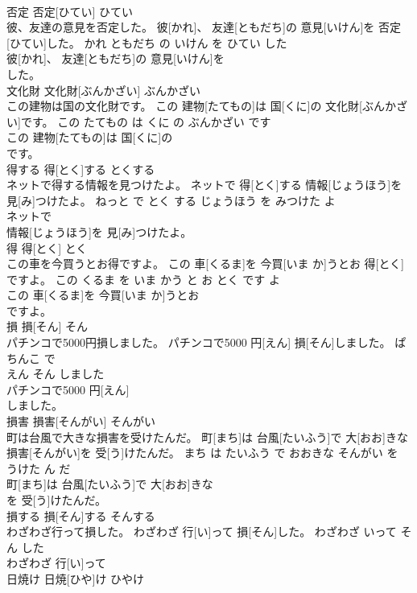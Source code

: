 \documentclass[8pt]{extreport}
\begin{document}
\begin{CJK}{UTF8}{min}
\\	否定	否定[ひてい]	ひてい	
\\	彼、友達の意見を否定した。	彼[かれ]、 友達[ともだち]の 意見[いけん]を 否定[ひてい]した。	かれ ともだち の いけん を ひてい した	
\\	彼[かれ]、 友達[ともだち]の 意見[いけん]を
\\	した。			
\\	文化財	文化財[ぶんかざい]	ぶんかざい	
\\	この建物は国の文化財です。	この 建物[たてもの]は 国[くに]の 文化財[ぶんかざい]です。	この たてもの は くに の ぶんかざい です	
\\	この 建物[たてもの]は 国[くに]の
\\	です。			
\\	得する	得[とく]する	とくする	
\\	ネットで得する情報を見つけたよ。	ネットで 得[とく]する 情報[じょうほう]を 見[み]つけたよ。	ねっと で とく する じょうほう を みつけた よ	
\\	ネットで
\\	情報[じょうほう]を 見[み]つけたよ。			
\\	得	得[とく]	とく	
\\	この車を今買うとお得ですよ。	この 車[くるま]を 今買[いま か]うとお 得[とく]ですよ。	この くるま を いま かう と お とく です よ	
\\	この 車[くるま]を 今買[いま か]うとお
\\	ですよ。			
\\	損	損[そん]	そん	
\\	パチンコで5000円損しました。	パチンコで5000 円[えん] 損[そん]しました。	ぱちんこ で 
\\	えん そん しました	
\\	パチンコで5000 円[えん]
\\	しました。			
\\	損害	損害[そんがい]	そんがい	
\\	町は台風で大きな損害を受けたんだ。	町[まち]は 台風[たいふう]で 大[おお]きな 損害[そんがい]を 受[う]けたんだ。	まち は たいふう で おおきな そんがい を うけた ん だ	
\\	町[まち]は 台風[たいふう]で 大[おお]きな
\\	を 受[う]けたんだ。			
\\	損する	損[そん]する	そんする	
\\	わざわざ行って損した。	わざわざ 行[い]って 損[そん]した。	わざわざ いって そん した	
\\	わざわざ 行[い]って
\\	日焼け	日焼[ひや]け	ひやけ	

\end{CJK}
\end{document}
